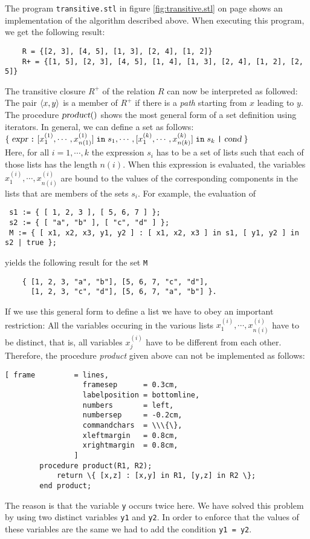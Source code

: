 \noindent
The program \texttt{transitive.stl} in figure
\ref{fig:transitive.stl} on page \pageref{fig:transitive.stl} shows an implementation of the
algorithm described above.
When executing this program, we get the following result:
\begin{verbatim}
    R = {[2, 3], [4, 5], [1, 3], [2, 4], [1, 2]}
    R+ = {[1, 5], [2, 3], [4, 5], [1, 4], [1, 3], [2, 4], [1, 2], [2, 5]}
\end{verbatim}
The transitive closure  $R^+$ of the relation $R$ can now be interpreted as followed:  
The pair  $\pair(x,y)$ is a member of $R^+$ if there is a \emph{path} starting from 
$x$ leading to $y$.  
The  procedure $\textsl{product}()$ shows the most general form of a set definition using iterators.
In general, we can define a set as follows:
\\[0.2cm]
\hspace*{1.3cm}
$\{\; \textsl{expr} \;\texttt{:}\; [x^{(1)}_1, \cdots, x^{(1)}_{n(1)}] \;\texttt{in}\; s_1,
     \cdots, [x^{(k)}_1, \cdots, x^{(k)}_{n(k)}] \;\texttt{in}\; s_k \;\texttt{|}\;
     \textsl{cond} \;\}
$
\\[0.2cm]
Here, for all $i=1, \cdots, k$ the expression $s_i$ has to be a set of lists such that each of
those lists has the length $n(i)$.  When this expression is evaluated, the variables 
$x^{(i)}_1, \cdots, x^{(i)}_{n(i)}$ are bound to the values of the corresponding components in the
lists that are members of the sets $s_i$.  For example, the evaluation of
\begin{verbatim}
 s1 := { [ 1, 2, 3 ], [ 5, 6, 7 ] };
 s2 := { [ "a", "b" ], [ "c", "d" ] };
 M := { [ x1, x2, x3, y1, y2 ] : [ x1, x2, x3 ] in s1, [ y1, y2 ] in s2 | true };
\end{verbatim}
yields the following result for the set  \texttt{M} 
\begin{verbatim}
    { [1, 2, 3, "a", "b"], [5, 6, 7, "c", "d"],  
      [1, 2, 3, "c", "d"], [5, 6, 7, "a", "b"] }.
\end{verbatim}

If we use this general form to define a list we have to obey an important restriction:
All the variables occuring in the various lists $x^{(i)}_1, \cdots, x^{(i)}_{n(i)}$
have to be distinct, that is, all variables  $x^{(i)}_j$ have to be different from each other.
Therefore, the procedure \textsl{product} given above can not be implemented as follows:
\begin{Verbatim}[ frame         = lines, 
                  framesep      = 0.3cm, 
                  labelposition = bottomline,
                  numbers       = left,
                  numbersep     = -0.2cm,
                  commandchars  = \\\{\},
                  xleftmargin   = 0.8cm,
                  xrightmargin  = 0.8cm,
                ]
        procedure product(R1, R2);
            return \{ [x,z] : [x,y] in R1, [y,z] in R2 \};
        end product;
\end{Verbatim} 
The reason is that the variable \texttt{y} occurs twice here.  
We have solved this problem by using two distinct variables
 \texttt{y1} and \texttt{y2}.  In order to enforce that the values of these variables are the same
 we had to add the condition \texttt{y1 = y2}.


